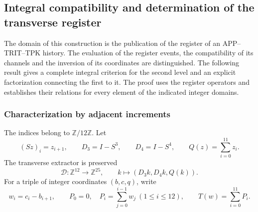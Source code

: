 \subsection{Integral compatibility and determination of the transverse register}
\label{x_reciprocidad:img09:seccion}

The domain of this construction is the publication of the register of an
APP--TRIT--TPK history. The evaluation of the register events,
the compatibility of its channels and the inversion of its
coordinates are distinguished. The following result gives a complete integral criterion for
the second level and an explicit factorization connecting the first to it.
The proof uses the register operators and establishes their
relations for every element of the indicated integer domains.

\subsubsection{Characterization by adjacent increments}

The indices belong to $\mathbb Z/12\mathbb Z$. Let
\[
 (Sz)_i=z_{i+1},\qquad D_3=I-S^3,\qquad D_4=I-S^4,
 \qquad Q(z)=\sum_{i=0}^{11}z_i.
\]
The transverse extractor is preserved
\[
 \mathcal D:\mathbb Z^{12}\longrightarrow\mathbb Z^{25},
 \qquad k\longmapsto(D_3k,D_4k,Q(k)).
\]
For a triple of integer coordinates $(b,c,q)$, write
\begin{equation}
 w_i=c_i-b_{i+1},\qquad
 P_0=0,\quad P_i=\sum_{j=0}^{i-1}w_j\ (1\leq i\leq12),
 \qquad T(w)=\sum_{i=0}^{11}P_i.
 \label{x_reciprocidad:img09:incremento}
\end{equation}

